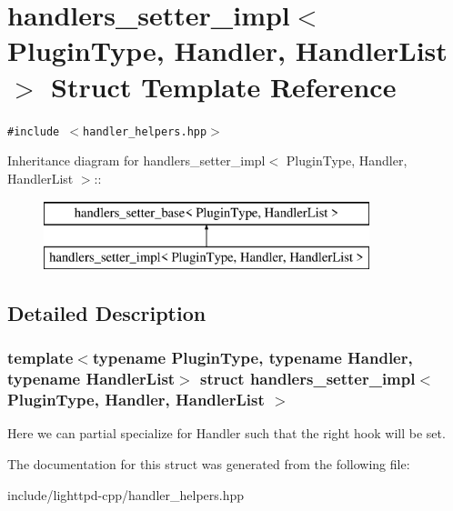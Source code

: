 \hypertarget{structhandlers__setter__impl}{
\section{handlers\_\-setter\_\-impl$<$ PluginType, Handler, HandlerList $>$ Struct Template Reference}
\label{structhandlers__setter__impl}
}
{\tt \#include $<$handler\_\-helpers.hpp$>$}

Inheritance diagram for handlers\_\-setter\_\-impl$<$ PluginType, Handler, HandlerList $>$::\begin{figure}[H]
\begin{center}
\leavevmode
\includegraphics[height=2cm]{structhandlers__setter__impl}
\end{center}
\end{figure}


\subsection{Detailed Description}
\subsubsection*{template$<$typename PluginType, typename Handler, typename HandlerList$>$ struct handlers\_\-setter\_\-impl$<$ PluginType, Handler, HandlerList $>$}

Here we can partial specialize for Handler such that the right hook will be set. 

The documentation for this struct was generated from the following file:\begin{CompactItemize}
\item 
include/lighttpd-cpp/handler\_\-helpers.hpp\end{CompactItemize}
